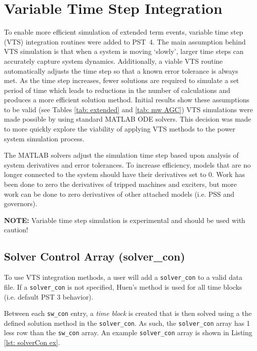 \section{Variable Time Step Integration}  
To enable more efficient simulation of extended term events, variable time step (VTS) integration routines were added to \mbox{PST 4}.
The main assumption behind VTS simulation is that when a system is moving `slowly', larger time steps can accurately capture system dynamics.
Additionally, a viable VTS routine automatically adjusts the time step so that a known error tolerance is always met.
As the time step increases, fewer solutions are required to simulate a set period of time which leads to reductions in the number of calculations and produces a more efficient solution method.
Initial results show these assumptions to be valid (see Tables \ref{tab: extended} and \ref{tab: mw AGC})
VTS simulations were made possible by using standard MATLAB ODE solvers.
This decision was made to more quickly explore the viability of applying VTS methods to the power system simulation process.

The MATLAB solvers adjust the simulation time step based upon analysis of system derivatives and error tolerances.
To increase efficiency, models that are no longer connected to the system should have their derivatives set to $0$.
Work has been done to zero the derivatives of tripped machines and exciters, but more work can be done to zero derivatives of other attached models (i.e. PSS and governors).

\vspace{3 em}
\begin{center}
\noindent \textbf{NOTE:} Variable time step simulation is experimental and should be used with caution!
\end{center}


\pagebreak
\subsection{Solver Control Array (solver\_con)}  
To use VTS integration methods, a user will add a \verb|solver_con| to a valid data file.
If a \verb|solver_con| is not specified, Huen's method is used for all time blocks (i.e. default PST 3 behavior).

Between each \verb|sw_con| entry, a \emph{time block} is created that is then solved using a the defined solution method in the \verb|solver_con|.
As such, the \verb|solver_con| array has 1 less row than the \verb|sw_con| array.
An example \verb|solver_con| array is shown in Listing \ref{lst: solverCon ex}.

